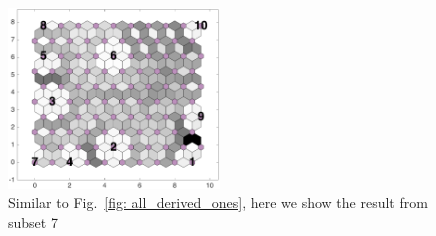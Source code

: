 \begin{figure}
        \centering
        \includegraphics[width=0.5\textwidth]{../../images0.01/M31/2D/image_subsets/subset7_dist_with_hits_t.png}
    \caption{Similar to Fig.~\ref{fig: all_derived_ones}, here we show the result  from subset 7}
    \label{fig: subset7}
\end{figure}